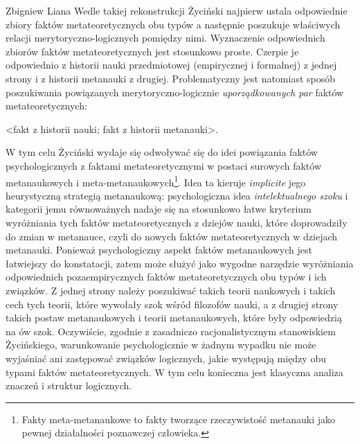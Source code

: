 \begin{artplenv}{Zbigniew Liana}
Wedle takiej rekonstrukcji Życiński najpierw ustala odpowiednie zbiory faktów metateoretycznych obu typów a następnie
poszukuje właściwych relacji merytoryczno-logicznych pomiędzy nimi. Wyznaczenie odpowiednich zbiorów faktów
metateoretycznych jest stosunkowo proste. Czerpie je odpowiednio z historii nauki przedmiotowej
(empirycznej i formalnej) z jednej strony i z historii metanauki z drugiej. Problematyczny jest natomiast sposób poszukiwania
powiązanych merytoryczno-logicznie \textit{uporządkowanych par} faktów metateoretycznych: 

\medskip
{\centering
{\textless}fakt z historii nauki; fakt z historii metanauki{\textgreater}.}
\smallskip


W tym celu Życiński wydaje się odwoływać się do idei powiązania faktów psychologicznych z faktami metateoretycznymi w postaci
surowych faktów metanaukowych i meta-metanaukowych\footnote{Fakty meta-metanaukowe to fakty tworzące
rzeczywistość metanauki jako pewnej działalności poznawczej człowieka.}. Idea ta kieruje \textit{implicite} jego
heurystyczną strategią metanaukową: psychologiczna idea \textit{intelektualnego szoku} i kategorii jemu równoważnych
nadaje się na stosunkowo łatwe kryterium wyróżniania tych faktów metateoretycznych z dziejów nauki, które doprowadziły
do zmian w metanauce, czyli do nowych faktów metateoretycznych w dziejach metanauki. Ponieważ psychologiczny aspekt
faktów metanaukowych jest łatwiejszy do konstatacji, zatem może służyć jako wygodne narzędzie wyróżniania odpowiednich
pozaempirycznych faktów metateoretycznych obu typów i ich związków. Z jednej strony należy poszukiwać takich teorii
naukowych i takich cech tych teorii, które wywołały szok wśród filozofów nauki, a z drugiej strony takich postaw
metanaukowych i teorii metanaukowych, które były odpowiedzią na ów szok. Oczywiście, zgodnie z zasadniczo
racjonalistycznym stanowiskiem Życińskiego, warunkowanie psychologicznie w żadnym wypadku nie może wyjaśniać ani
zastępować związków logicznych, jakie występują między obu typami faktów metateoretycznych. W tym celu konieczna jest
klasyczna analiza znaczeń i struktur logicznych.


\end{artplenv}
